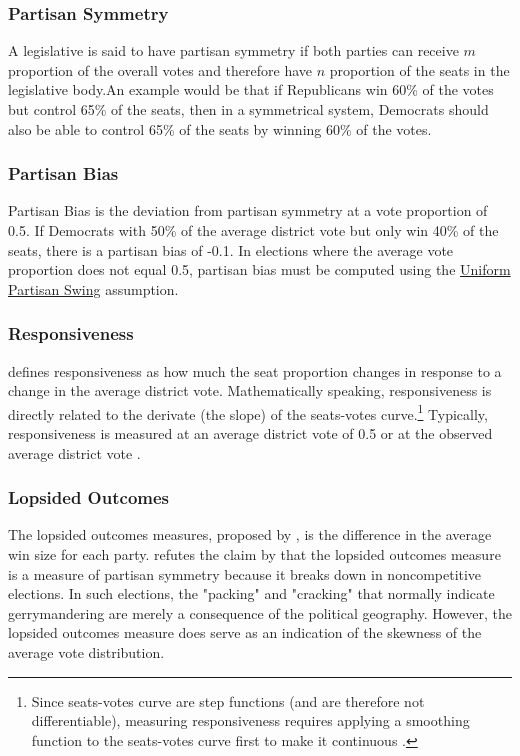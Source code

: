 \subsubsection{Partisan Symmetry}

A legislative is said to have partisan symmetry if both parties can receive $m$ proportion of the overall votes and therefore have $n$ proportion of the seats in the legislative body.An example would be that if Republicans win 60\% of the votes but control 65\% of the seats, then in a symmetrical system, Democrats should also be able to control 65\% of the seats by winning 60\% of the votes. \textcite{katz2020}

\subsubsection{Partisan Bias}

Partisan Bias is the deviation from partisan symmetry at a vote proportion of 0.5. If Democrats with 50\% of the average district vote but only win 40\% of the seats, there is a partisan bias of -0.1. In elections where the average vote proportion does not equal 0.5, partisan bias must be computed using the \hyperref[sec:ups]{Uniform Partisan Swing} assumption. \parencite{katz2020}

\subsubsection{Responsiveness}

\textcite{katz2020} defines responsiveness as how much the seat proportion changes in response to a change in the average district vote. Mathematically speaking, responsiveness is directly related to the derivate (the slope) of the seats-votes curve.\footnote{Since seats-votes curve are step functions (and are therefore not differentiable), measuring responsiveness requires applying a smoothing function to the seats-votes curve first to make it continuous \parencite{katz2020}.} Typically, responsiveness is measured at an average district vote of 0.5 or at the observed average district vote \parencite{katz2020}.

\subsubsection{Lopsided Outcomes}

The lopsided outcomes measures, proposed by \textcite{wang2016}, is the difference in the average win size for each party.  \textcite{katz2020} refutes the claim by \textcite{wang2016} that the lopsided outcomes measure is a measure of partisan symmetry because it breaks down in noncompetitive elections. In such elections, the "packing" and "cracking" that normally indicate gerrymandering are merely a consequence of the political geography. However, the lopsided outcomes measure does serve as an indication of the skewness of the average vote distribution. 

